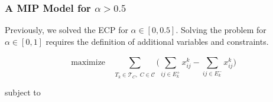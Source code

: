 \subsubsection{A MIP Model for $\alpha > 0.5$}

Previously, we solved the \acrshort{ECP} for $\alpha \in [0, 0.5]$. Solving the problem for $\alpha \in [0, 1]$ requires the definition of
additional variables and constraints.

\begin{equation}
	\label{eq:ecp-exact2}
	\text{maximize}\quad \sum_{ T_{k} \in \mathcal{T}_{C}, \; C \in
		\mathcal{\hat{C}} } \big( \sum^{}_{ij \in E^{+}_k } x_{ij}
	^{k} - \sum_{ij \in E^{-} _k} x_{ij} ^{k} \big)
\end{equation} \begin{center} subject to \end{center}
